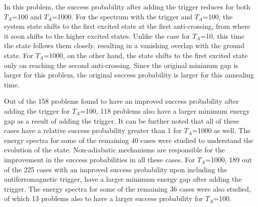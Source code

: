 \documentclass[../main.tex]{subfiles}
\begin{document}
In this problem, the success probability after adding the trigger reduces for both $T_A$=100 and $T_A$=1000. For the spectrum with the trigger and $T_A$=100, the system state shifts to the first excited state at the first anti-crossing, from where it soon shifts to the higher excited states. Unlike the case for $T_A$=10, this time the state follows them closely, resulting in a vanishing overlap with the ground state. For $T_A$=1000, on the other hand, the state shifts to the first excited state only on reaching the second anti-crossing. Since the original minimum gap is larger for this problem, the original success probability is larger for this annealing time.


Out of the 158 problems found to have an improved success probability after adding the trigger for $T_A$=100, 118 problems also have a larger minimum energy gap as a result of adding the trigger. It can be further noted that all of these cases have a relative success probability greater than 1 for $T_A$=1000 as well. The energy spectra for some of the remaining 40 cases were studied to understand the evolution of the state. Non-adiabatic mechanisms are responsible for the improvement in the success probabilities in all these cases.
For $T_A$=1000, 189 out of the 225 cases with an improved success probability upon including the antiferromagnetic trigger, have a larger minimum energy gap after adding the trigger. The energy spectra for some of the remaining 36 cases were also studied, of which 13 problems also to have a larger success probability for $T_A$=100.\\
\end{document}
